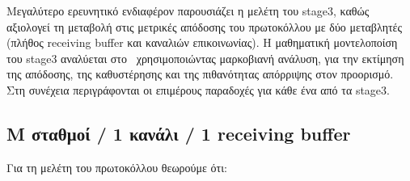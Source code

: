 \documentclass[12pt]{report}
\begin{document}
Μεγαλύτερο ερευνητικό ενδιαφέρον παρουσιάζει η μελέτη του \textlatin{stage3}, καθώς αξιολογεί τη μεταβολή στις μετρικές απόδοσης του πρωτοκόλλου με δύο μεταβλητές (πλήθος \textlatin{receiving buffer} και καναλιών επικοινωνίας). Η μαθηματική μοντελοποίση του \textlatin{stage3} αναλύεται στο~\cite{paper:12} χρησιμοποιώντας μαρκοβιανή ανάλυση, για την εκτίμηση της απόδοσης, της καθυστέρησης και της πιθανότητας απόρριψης στον προορισμό. Στη συνέχεια περιγράφονται οι επιμέρους παραδοχές για κάθε ένα από τα \textlatin{stage3}.

\subsection{\textlatin{M} σταθμοί / 1 κανάλι / 1 \textlatin{receiving buffer}}
Για τη μελέτη του πρωτοκόλλου θεωρούμε ότι:
\end{document}
